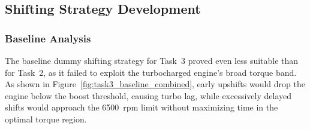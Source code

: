 \subsection{Shifting Strategy Development}

\subsubsection{Baseline Analysis}

The baseline dummy shifting strategy for Task~3 proved even less suitable than for Task~2, as it failed to exploit the turbocharged engine's broad torque band. As shown in Figure~\ref{fig:task3_baseline_combined}, early upshifts would drop the engine below the boost threshold, causing turbo lag, while excessively delayed shifts would approach the 6500~rpm limit without maximizing time in the optimal torque region.

